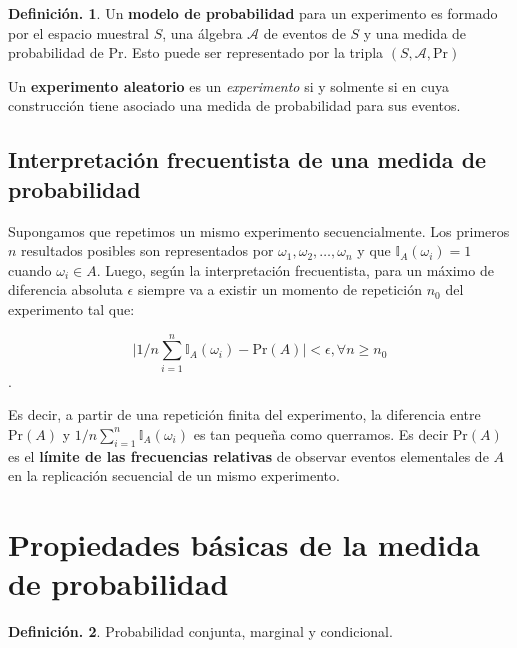 \documentclass[]{book}
\theoremstyle{definition}
\newtheorem{definition}{Definición.}[chapter]
\theoremstyle{definition}
\theoremstyle{definition}
\theoremstyle{remark}
\begin{document}
\begin{definition}
\protect\hypertarget{def:unnamed-chunk-122}{}{\label{def:unnamed-chunk-122} }
Un \textbf{modelo de probabilidad} para un experimento es
formado por el espacio muestral \(S\), una álgebra
\(\mathcal{A}\) de eventos de \(S\) y
una medida de probabilidad de Pr. Esto puede ser
representado por la tripla \((S, \mathcal{A}, \mbox{Pr})\)

Un \textbf{experimento aleatorio} es un \emph{experimento} si y
solmente si en cuya construcción tiene asociado una
medida de probabilidad
para sus eventos.
\end{definition}

\hypertarget{interpretaciuxf3n-frecuentista-de-una-medida-de-probabilidad}{%
\subsection{Interpretación frecuentista de una medida de probabilidad}\label{interpretaciuxf3n-frecuentista-de-una-medida-de-probabilidad}}

Supongamos que repetimos un mismo experimento
secuencialmente. Los primeros \(n\) resultados posibles
son representados por \(\omega_1 , \omega_2, \ldots, \omega_n\) y que \(\mathbb{I}_A (\omega_i)= 1\)
cuando \(\omega_i \in A\). Luego, según la interpretación
frecuentista, para un máximo de diferencia absoluta
\(\epsilon\) siempre va a existir un momento de repetición
\(n_0\) del experimento tal que:

\[\big | 1/n\sum_{i=1}^{n} \mathbb{I}_A(\omega_i) -
\mbox{Pr}(A)\big |
< \epsilon, \forall n\geq n_0\].

Es decir, a partir de una repetición finita del
experimento, la diferencia entre \(\mbox{Pr}(A)\) y
\(1/n\sum_{i=1}^{n} \mathbb{I}_A(\omega_i)\) es tan
pequeña
como querramos. Es decir Pr\((A)\) es el \textbf{límite de las
frecuencias relativas} de observar eventos elementales
de \(A\) en la replicación secuencial de un mismo
experimento.

\hypertarget{propiedades-buxe1sicas-de-la-medida-de-probabilidad}{%
\section{Propiedades básicas de la medida de probabilidad}\label{propiedades-buxe1sicas-de-la-medida-de-probabilidad}}

\begin{definition}
\protect\hypertarget{def:unnamed-chunk-123}{}{\label{def:unnamed-chunk-123} }Probabilidad conjunta, marginal y condicional.
\end{definition}
\end{document}
